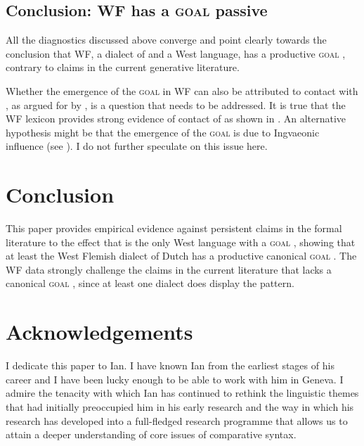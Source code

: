 \documentclass[output=paper]{langsci/langscibook}
\begin{document}
\subsection{Conclusion: WF has a \textsc{goal} passive}\label{sec:04.2.5}

All the diagnostics discussed above converge and point clearly towards the
conclusion that WF, a dialect of  and a West  language, has
a productive \textsc{goal} , contrary to claims in the current
generative literature.

Whether the emergence of the \textsc{goal}  in \gls{WF} can also be attributed to contact with , as argued for
 by \citet{SteinTripsIngham2016}, is a question that needs to be
addressed. It is true that the \gls{WF} lexicon provides
strong evidence of contact of  as shown in \citet{Haegeman2009}.
An alternative hypothesis might be that the emergence of the \textsc{goal}
 is due to Ingvaeonic influence (see \citealt{Dhaenens2014}). I do
not further speculate on this issue here.

\section{Conclusion}\label{sec:04.4} %

This paper provides empirical evidence against persistent claims in the formal
literature to the effect that  is the only West  language
with a \textsc{goal} , showing that at least the West Flemish
dialect of Dutch has a productive canonical \textsc{goal} . The
\gls{WF} data strongly challenge the claims in the current
literature that  lacks a canonical \textsc{goal} ,
since at least one  dialect does display the pattern.

\printchapterglossary{}

\section*{Acknowledgements}\largerpage

I dedicate this paper to Ian. I have known Ian from the earliest stages of his
career and I have been lucky enough to be able to work with him in Geneva. I
admire the tenacity with which Ian has continued to rethink the linguistic
themes that had initially preoccupied him in his early research and the way in
which his research has developed into a full-fledged research programme that
allows us to attain a deeper understanding of core issues of comparative
syntax.

{\sloppy\printbibliography[heading=subbibliography,notkeyword=this]}
\end{document}
